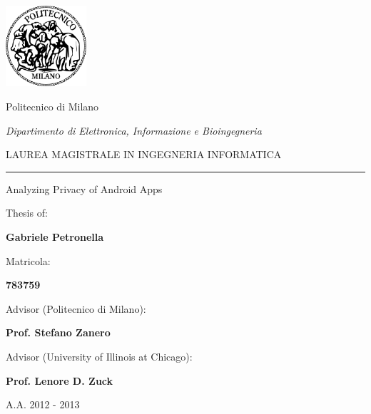 \documentclass[a4paper,12pt,twoside,final]{book}
\theoremstyle{definition}
\newcommand{\thesisTitle}{Analyzing Privacy of Android Apps}
\begin{document}
	\begin{titlepage}
	\vspace*{\fill}
	\begin{spacing}{1.5}
	\begin{center}

		\includegraphics[width=3cm]{images/logo-polimi.png}
		
		Politecnico di Milano

		\textit{Dipartimento di Elettronica, Informazione e Bioingegneria}

		\vspace{0.2cm}

		{LAUREA MAGISTRALE IN INGEGNERIA INFORMATICA}

		\noindent\rule{10cm}{0.4pt}
		
		\vspace{0.5cm}

		{\Large \thesisTitle}
		
	\end{center}
	\vspace{1.5cm}
	\begin{flushright}
		Thesis of:

		\textbf{Gabriele Petronella}

		\vspace{0.5cm}

		Matricola:

		\textbf{783759}
	\end{flushright}
	\begin{flushleft}
		Advisor (Politecnico di Milano):

		\textbf{Prof. Stefano Zanero}

		\vspace{0.5cm}

		Advisor (University of Illinois at Chicago):
		
		\textbf{Prof. Lenore D. Zuck}
	\end{flushleft}

	\vspace{0.7cm}

	\begin{center}
		{\footnotesize{}\selectfont A.A. 2012 - 2013}
	\end{center}

	\end{spacing}
	\vspace*{\fill}
	\end{titlepage}
\end{document}
